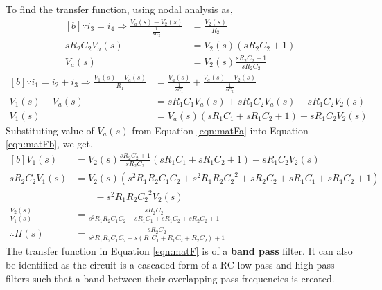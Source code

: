 \documentclass{lab_sheet}
\begin{document}
To find the transfer function, using nodal analysis as,
\begin{equation}
  \begin{aligned}[b]
  \because i_3=i_4 \Rightarrow \frac{V_a(s)-V_2(s)}{\frac{1}{sC_2}}&=\frac{V_2(s)}{R_2}\\
  sR_2C_2V_a(s)&=V_2(s)(sR_2C_2+1)\\
  V_a(s)&=V_2(s)\frac{sR_2C_2+1}{sR_2C_2}
\end{aligned}
\label{eqn:matFa}
\end{equation}
\begin{equation}
   \begin{aligned}[b]
   \because i_1=i_2+i_3 \Rightarrow \frac{V_1(s)-V_a(s)}{R_1}&=\frac{V_a(s)}{\frac{1}{sC_1}}+\frac{V_a(s)-V_2(s)}{\frac{1}{sC_2}}\\
   V_1(s)-V_a(s)&=sR_1C_1V_a(s)+sR_1C_2V_a(s)-sR_1C_2V_2(s)\\
   V_1(s)&=V_a(s)(sR_1C_1+sR_1C_2+1)-sR_1C_2V_2(s)
 \end{aligned}
 \label{eqn:matFb}
 \end{equation}
 Substituting value of $V_a(s)$ from Equation \ref{eqn:matFa} into Equation \ref{eqn:matFb}, we get,
 \begin{equation}
   \begin{aligned}[b]
   V_1(s)&=V_2(s)\frac{sR_2C_2+1}{sR_2C_2}(sR_1C_1+sR_1C_2+1)-sR_1C_2V_2(s)\\
  sR_2C_2V_1(s)&=V_2(s)(s^2R_1R_2C_1C_2+s^2R_1R_2{C_2}^2+sR_2C_2+sR_1C_1+sR_1C_2+1)\\
  & \quad \quad -s^2R_1R_2{C_2}^2V_2(s)\\
  \frac{V_2(s)}{V_1(s)}&=\frac{sR_2C_2}{s^2R_1R_2C_1C_2+sR_1C_1+sR_1C_2+sR_2C_2+1}\\
  \therefore H(s)&=\frac{sR_2C_2}{s^2R_1R_2C_1C_2+s(R_1C_1+R_1C_2+R_2C_2)+1}
 \end{aligned}
 \label{eqn:matF}
 \end{equation}
The transfer function in Equation \ref{eqn:matF} is of a \textbf{band pass} filter. It can also be identified as the circuit
is a cascaded form of a RC low pass and high pass filters such that a band between their overlapping pass frequencies is created.


\end{document}
